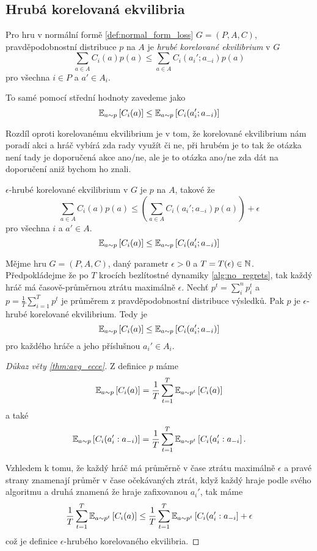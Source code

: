 \subsection{Hrubá korelovaná ekvilibria}
\begin{definition}
\label{def:cce}
Pro hru v normální formě \ref{def:normal_form_loss} $G= (P,A,C)$, pravděpodobnostní distribuce $p$ na $A$ je \textit{hrubé korelované ekvilibrium} v $G$ 
\[
    \sum_{a \in A} C_i(a)p(a) \leq \sum_{a \in A} C_i(a_i';a_{-i}) p(a)
\]
pro všechna $i \in P$ a $a'\in A_i$. 

To samé pomocí střední hodnoty zavedeme jako 
\[
    \E[a \sim p]{C_i(a)} \leq \E[a\sim p]{C_i(a_i';a_{-i})}
\]
\end{definition}
Rozdíl oproti korelovanému ekvilibrium je v tom, že korelované ekvilibrium nám poradí akci a hráč vybírá zda rady využít či ne, při hrubém je to tak že otázka není tady je doporučená akce ano/ne, ale je to otázka ano/ne zda dát na doporučení aniž bychom ho znali. 

\begin{definition}
\label{def:e_cce}
$\epsilon$-hrubé korelované ekvilibrium v $G$ je $p$ na $A$, takové že 
\[
    \sum_{a \in A} C_i(a)p(a) \leq \left( \sum_{a \in A} C_i(a_i';a_{-i}) p(a) \right) + \epsilon 
\]
pro všechna $i$ a $a' \in A$. 
\[
    \E[a \sim p]{C_i(a)} \leq \E[a\sim p]{C_i(a_i';a_{-i})}
\]
\end{definition}

\begin{theorem}\label{thm:avg_ecce}
Mějme hru $G=(P,A,C)$, daný parametr $\epsilon > 0$ a $T = T(\epsilon) \in \N$. Předpokládejme že po $T$ krocích bezlítostné dynamiky \ref{alg:no_regrets}, tak každý hráč má časově-průměrnou ztrátu maximálně $\epsilon$. 
Nechť $p^t =\sum_i^n p^t_i$ a $p = \frac{1}{T} \sum^T_{i=1} p^t$ je průměrem z pravděpodobnostní distribuce výsledků. Pak $p$ je $\epsilon$-hrubé korelované ekvilibrium. Tedy je  
\[
    \E[a \sim p]{C_i(a)} \leq \E[a\sim p]{C_i(a_i';a_{-i})}
\]
pro každého hráče a jeho příslušnou $a_i' \in A_i$.
\end{theorem}
\begin{proof}[Důkaz věty \ref{thm:avg_ecce}]
    Z definice $p$ máme 
    \[
        \E[a \sim p]{C_i(a)} = \frac{1}{T} \sum^T_{t=1} \E[a\sim p^t]{C_i(a)}
    \]
    a také
    \[
        \E[a \sim p]{C_i(a_i':a_{-i})} = \frac{1}{T} \sum^T_{t=1} \E[a\sim p^t]{C_i(a_i':a_{-i}}.
    \]

    Vzhledem k tomu, že každý hráč má průměrně v čase ztrátu maximálně $\epsilon$ a pravé strany znamenají průměr v čase očekávaných ztrát, když každý hraje podle svého algoritmu a druhá znamená že hraje zafixovanou $a_i'$, tak máme 
    \[
         \frac{1}{T} \sum^T_{t=1} \E[a\sim p^t]{C_i(a)} \leq \frac{1}{T} \sum^T_{t=1} \E[a\sim p^t]{C_i(a_i':a_{-i}} + \epsilon  
    \]
    což je definice $\epsilon$-hrubého korelovaného ekvilibria. 
\end{proof}
